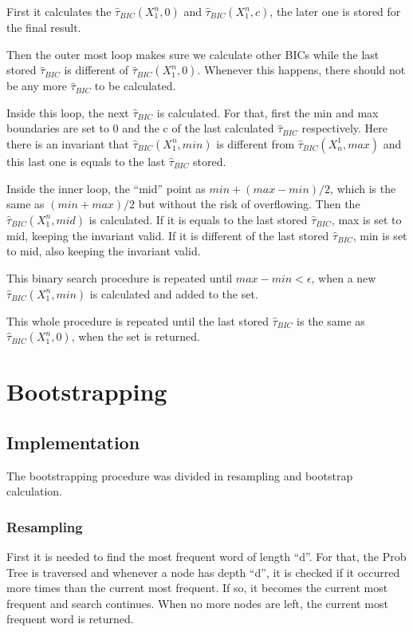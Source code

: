 \documentclass[brazil,11pt]{article}
\begin{document}
First it calculates the $\hat{\tau}_{BIC}(X^n_1, 0)$ and $\hat{\tau}_{BIC}(X^n_1, c)$, the later one is stored for the final result.

Then the outer most loop makes sure we calculate other BICs while the last stored $\hat{\tau}_{BIC}$ is different of $\hat{\tau}_{BIC}(X^n_1, 0)$. Whenever this happens, there should not be any more $\hat{\tau}_{BIC}$ to be calculated.

Inside this loop, the next $\hat{\tau}_{BIC}$ is calculated. For that, first the min and max boundaries are set to 0 and the c of the last calculated $\hat{\tau}_{BIC}$ respectively. Here there is an invariant that $\hat{\tau}_{BIC}(X^n_1, min)$ is different from $\hat{\tau}_{BIC}(X^1_n, max)$ and this last one is equals to the last $\hat{\tau}_{BIC}$ stored.

Inside the inner loop, the ``mid'' point as $min + (max - min) / 2$, which is the same as $(min + max) / 2$ but without the risk of overflowing. Then the $\hat{\tau}_{BIC}(X^n_1, mid)$ is calculated. If it is equals to the last stored $\hat{\tau}_{BIC}$, max is set to mid, keeping the invariant valid. If it is different of the last stored $\hat{\tau}_{BIC}$, min is set to mid, also keeping the invariant valid.

This binary search procedure is repeated until $max - min < \epsilon$, when a new $\hat{\tau}_{BIC}(X^n_1, min)$ is calculated and added to the set.

This whole procedure is repeated until the last stored $\hat{\tau}_{BIC}$ is the same as $\hat{\tau}_{BIC}(X^n_1,0)$, when the set is returned.

\section{Bootstrapping}

\subsection{Implementation}

The bootstrapping procedure was divided in resampling and bootstrap calculation.

\subsubsection{Resampling}

First it is needed to find the most frequent word of length ``d''. For that, the Prob Tree is traversed and whenever a node has depth ``d'', it is checked if it occurred more times than the current most frequent. If so, it becomes the current most frequent and search continues. When no more nodes are left, the current most frequent word is returned.
\end{document}
